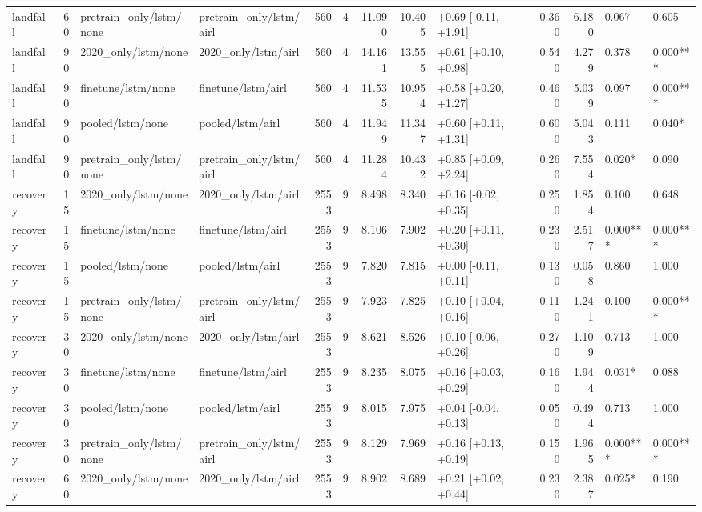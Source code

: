 \begin{tabular}{lrllrrrrlrrll}
landfall & 60 & pretrain_only/lstm/none & pretrain_only/lstm/airl & 560 & 4 & 11.090 & 10.405 & +0.69 [-0.11, +1.91] & 0.360 & 6.180 & 0.067 & 0.605 \\
landfall & 90 & 2020_only/lstm/none & 2020_only/lstm/airl & 560 & 4 & 14.161 & 13.555 & +0.61 [+0.10, +0.98] & 0.540 & 4.279 & 0.378 & 0.000*** \\
landfall & 90 & finetune/lstm/none & finetune/lstm/airl & 560 & 4 & 11.535 & 10.954 & +0.58 [+0.20, +1.27] & 0.460 & 5.039 & 0.097 & 0.000*** \\
landfall & 90 & pooled/lstm/none & pooled/lstm/airl & 560 & 4 & 11.949 & 11.347 & +0.60 [+0.11, +1.31] & 0.600 & 5.043 & 0.111 & 0.040* \\
landfall & 90 & pretrain_only/lstm/none & pretrain_only/lstm/airl & 560 & 4 & 11.284 & 10.432 & +0.85 [+0.09, +2.24] & 0.260 & 7.554 & 0.020* & 0.090 \\
recovery & 15 & 2020_only/lstm/none & 2020_only/lstm/airl & 2553 & 9 & 8.498 & 8.340 & +0.16 [-0.02, +0.35] & 0.250 & 1.854 & 0.100 & 0.648 \\
recovery & 15 & finetune/lstm/none & finetune/lstm/airl & 2553 & 9 & 8.106 & 7.902 & +0.20 [+0.11, +0.30] & 0.230 & 2.517 & 0.000*** & 0.000*** \\
recovery & 15 & pooled/lstm/none & pooled/lstm/airl & 2553 & 9 & 7.820 & 7.815 & +0.00 [-0.11, +0.11] & 0.130 & 0.058 & 0.860 & 1.000 \\
recovery & 15 & pretrain_only/lstm/none & pretrain_only/lstm/airl & 2553 & 9 & 7.923 & 7.825 & +0.10 [+0.04, +0.16] & 0.110 & 1.241 & 0.100 & 0.000*** \\
recovery & 30 & 2020_only/lstm/none & 2020_only/lstm/airl & 2553 & 9 & 8.621 & 8.526 & +0.10 [-0.06, +0.26] & 0.270 & 1.109 & 0.713 & 1.000 \\
recovery & 30 & finetune/lstm/none & finetune/lstm/airl & 2553 & 9 & 8.235 & 8.075 & +0.16 [+0.03, +0.29] & 0.160 & 1.944 & 0.031* & 0.088 \\
recovery & 30 & pooled/lstm/none & pooled/lstm/airl & 2553 & 9 & 8.015 & 7.975 & +0.04 [-0.04, +0.13] & 0.050 & 0.494 & 0.713 & 1.000 \\
recovery & 30 & pretrain_only/lstm/none & pretrain_only/lstm/airl & 2553 & 9 & 8.129 & 7.969 & +0.16 [+0.13, +0.19] & 0.150 & 1.965 & 0.000*** & 0.000*** \\
recovery & 60 & 2020_only/lstm/none & 2020_only/lstm/airl & 2553 & 9 & 8.902 & 8.689 & +0.21 [+0.02, +0.44] & 0.230 & 2.387 & 0.025* & 0.190 \\

\end{tabular}
